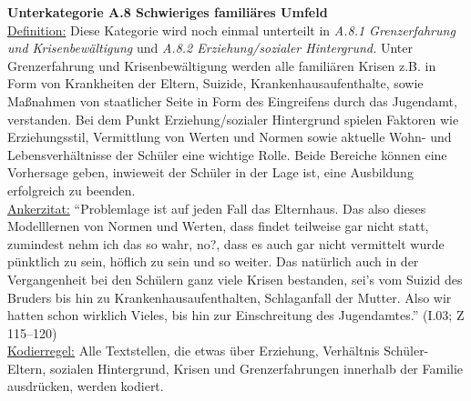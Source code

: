 \noindent
\textbf{Unterkategorie A.8 Schwieriges familiäres Umfeld}\\
\underline{Definition:} Diese Kategorie wird noch einmal unterteilt in \textit{A.8.1 Grenzerfahrung und Krisenbewältigung} und \textit{A.8.2 Erziehung/sozialer Hintergrund.} Unter Grenzerfahrung und Krisenbewältigung werden alle familiären Krisen z.B. in Form von Krankheiten der Eltern, Suizide, Krankenhausaufenthalte, sowie Maßnahmen von staatlicher Seite in Form des Eingreifens durch das Jugendamt, verstanden. Bei dem Punkt Erziehung/sozialer Hintergrund spielen Faktoren wie Erziehungsstil, Vermittlung von Werten und Normen sowie aktuelle Wohn- und Lebensverhältnisse der Schüler eine wichtige Rolle. Beide Bereiche können eine Vorhersage geben, inwieweit der Schüler in der Lage ist, eine Ausbildung erfolgreich zu beenden.\\
\underline{Ankerzitat:} "`Problemlage ist auf jeden Fall das Elternhaus. Das also dieses Modelllernen von Normen und Werten, dass findet teilweise gar nicht statt, zumindest nehm ich das so wahr, no?, dass es auch gar nicht vermittelt wurde pünktlich zu sein, höflich zu sein und so weiter. Das natürlich auch in der Vergangenheit bei den Schülern ganz viele Krisen bestanden, sei's vom Suizid des Bruders bis hin zu Krankenhausaufenthalten, Schlaganfall der Mutter. Also wir hatten schon wirklich Vieles, bis hin zur Einschreitung des Jugendamtes."' (I.03; Z 115--120)\\
\underline{Kodierregel:} Alle Textstellen, die etwas über Erziehung, Verhältnis Schüler-Eltern, sozialen Hintergrund, Krisen und Grenzerfahrungen innerhalb der Familie ausdrücken, werden kodiert.\\

